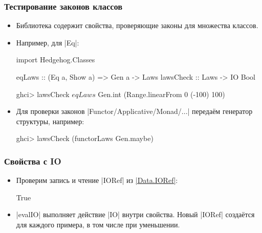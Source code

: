 \documentclass[11pt]{beamer}
\begin{document}
\begin{frame}[fragile]
  \frametitle{Тестирование законов классов}
  \begin{itemize}
    \item Библиотека  содержит свойства, проверяющие законы для множества классов.
    \item Например, для \haskinline|Eq|:
          \begin{haskellsmall}
            import Hedgehog.Classes

            eqLaws :: (Eq a, Show a) => Gen a -> Laws
            lawsCheck :: Laws -> IO Bool

            ghci> lawsCheck $ eqLaws $
                    Gen.int (Range.linearFrom 0 (-100) 100)
          \end{haskellsmall}
          \pause
    \item Для проверки законов \haskinline|Functor/Applicative/Monad/...| передаём генератор структуры, например:
          \begin{haskellsmall}
            ghci> lawsCheck (functorLaws Gen.maybe)
          \end{haskellsmall}
  \end{itemize}
\end{frame}

\begin{frame}[fragile]
  \frametitle{Свойства с IO}
  \begin{itemize}
    \item Проверим запись и чтение \haskinline|IORef| из \href{https://hackage.haskell.org/package/base/docs/Data-IORef.html}{\haskinline|Data.IORef|}:
          \pause
          \begin{ghcismall}
            True
          \end{ghcismall}
    \item \haskinline|evalIO| выполняет действие \haskinline|IO| внутри свойства. Новый \haskinline|IORef| создаётся для каждого примера, в том числе при уменьшении.
  \end{itemize}
\end{frame}
\end{document}
